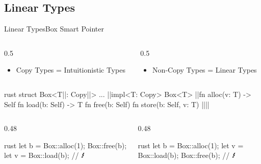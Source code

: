 \documentclass[aspectratio=169,onlytextwidth]{beamer}
\begin{document}
\subsection{Linear Types}

\begin{frame}[fragile]{Linear Types}{Box Smart Pointer}
  \centering

  \begin{columns}
    \begin{column}{0.5\textwidth}
      \begin{itemize}
        \item Copy Types = Intuitionistic Types
      \end{itemize}
    \end{column}

    \begin{column}{0.5\textwidth}
      \begin{itemize}
        \item Non-Copy Types = Linear Types
      \end{itemize}
    \end{column}
  \end{columns}


  \begin{lst}{rust}
    struct Box<T||: Copy||> { ... }
    ||impl<T: Copy> Box<T> {
      ||fn alloc(v: T) -> Self {}   fn load(b: Self) -> T {}
      fn free(b: Self) {}         fn store(b: Self, v: T) {}
    ||}||
  \end{lst}

  \vspace{-3mm}

  \begin{columns}
    \begin{column}{0.48\textwidth}
      \begin{lst}{rust}
        let b = Box::alloc(1);
        Box::free(b);
        let v = Box::load(b); // $\text{\Lightning}$
      \end{lst}
    \end{column}


    \begin{column}{0.48\textwidth}
      \begin{lst}{rust}
        let b = Box::alloc(1);
        let v = Box::load(b);
        Box::free(b); // $\text{\Lightning}$
      \end{lst}
    \end{column}
  \end{columns}

\end{frame}
\end{document}
